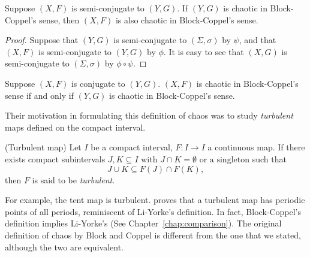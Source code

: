 \documentclass[10pt,twoside]{book}
\begin{document}
\begin{theorem}
  Suppose $(X, F)$ is semi-conjugate to $(Y, G)$.
  If $(Y, G)$ is chaotic in Block-Coppel's sense, then $(X, F)$ is also chaotic in Block-Coppel's sense.
  \begin{proof}
    Suppose that $(Y, G)$ is semi-conjugate to $(\Sigma, \sigma)$ by $\psi$, and that $(X, F)$ is semi-conjugate to $(Y, G)$ by $\phi$.
    It is easy to see that $(X, G)$ is semi-conjugate to $(\Sigma, \sigma)$ by $\phi \circ \psi$.
  \end{proof}
  \begin{center}
  \end{center}
\end{theorem}
\begin{corollary}
  Suppose $(X, F)$ is conjugate to $(Y, G)$.
  $(X, F)$ is chaotic in Block-Coppel's sense if and only if $(Y, G)$ is chaotic in Block-Coppel's sense.
\end{corollary}
Their motivation in formulating this definition of chaos was to study \textit{turbulent} maps defined on the compact interval.
\begin{definition}
  (Turbulent map)
  Let $I$ be a compact interval, $F: I \to I$ a continuous map.
  If there exists compact subintervals $J,K \subseteq I$ with $J \cap K = \emptyset \mbox{ or a singleton}$ such that
  \begin{equation*}
    J \cup K \subseteq F(J) \cap F(K),
  \end{equation*}
  then $F$ is said to be \textit{turbulent}.
\end{definition}
For example, the tent map is turbulent.
\citet{blockcoppel} proves that a turbulent map has periodic points of all periods, reminiscent of Li-Yorke's definition.
In fact, Block-Coppel's definition implies Li-Yorke's (See Chapter~\ref{chap:comparison}).
The original definition of chaos by Block and Coppel is different from the one that we stated, although the two are equivalent.
\end{document}
